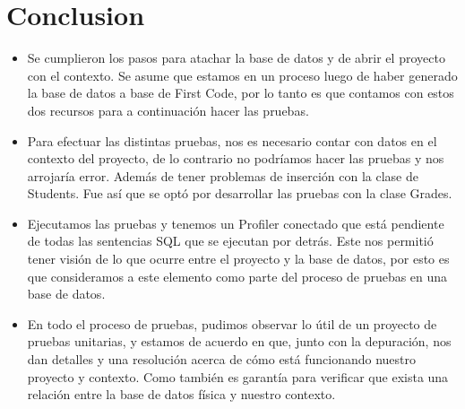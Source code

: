 \section{Conclusion} 

\begin{itemize}


	\item Se cumplieron los pasos para atachar la base de datos y de abrir el proyecto con el contexto. Se asume que estamos en un proceso luego de haber generado la base de datos a base de First Code, por lo tanto es que contamos con estos dos recursos para a continuación hacer las pruebas.
	\item Para efectuar las distintas pruebas, nos es necesario contar con datos en el contexto del proyecto, de lo contrario no podríamos hacer las pruebas y nos arrojaría error. Además de tener problemas de inserción con la clase de Students. Fue así que se optó por desarrollar las pruebas con la clase Grades.
	\item Ejecutamos las pruebas y tenemos un Profiler conectado que está pendiente de todas las sentencias SQL que se ejecutan por detrás. Este nos permitió tener visión de lo que ocurre entre el proyecto y la base de datos, por esto es que consideramos a este elemento como parte del proceso de pruebas en una base de datos.
	\item En todo el proceso de pruebas, pudimos observar lo útil de un proyecto de pruebas unitarias, y estamos de acuerdo en que, junto con la depuración, nos dan detalles y una resolución acerca de cómo está funcionando nuestro proyecto y contexto. Como también es garantía para verificar que exista una relación entre la base de datos física y nuestro contexto.

\end{itemize}
